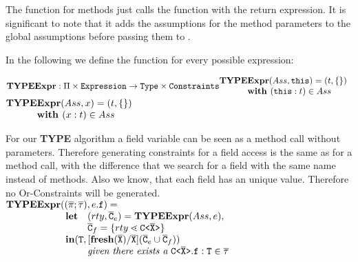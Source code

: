 \documentclass[a4paper,USenglish,cleveref, autoref, thm-restate]{lipics-v2021}
\begin{document}
The \typeMethod function for methods just calls the \typeExpr function with the
return expression. It is significant to note that it adds the assumptions for the method parameters to the global assumptions before passing them to \typeExpr.

\smallskip

In the following we define the \typeExpr function for every possible expression:

\smallskip

\noindent
$\typeExpr: \typeAssumptionsSymbol \times
\texttt{Expression} \rightarrow \texttt{Type} \times \texttt{Constraints}\\
\begin{array}{@{}l@{}l}
\textbf{TY} \textbf{PE} & \textbf{Expr} (Ass, \mathtt{this}) = (t , \{\})\\
& \textbf{with } (\mathtt{this} : t) \in Ass 
\end{array}
$
\smallskip
$\begin{array}{@{}l@{}l}
\textbf{TY} \textbf{PE} & \textbf{Expr} (Ass,x) = (t , \{\})\\
& \textbf{with } (x : t) \in Ass 
\end{array}
$

\smallskip

For our \textbf{TYPE} algorithm a field variable can be seen as a method call without parameters.
Therefore generating constraints for a field access is the same as for a method call,
with the difference that we search for a field with the same name instead of methods.
Also we know, that each field has an unique value. Therefore no Or-Constraints will be generated.
\\
\noindent
$\begin{array}{@{}l@{}l}
\typeExpr{} &(\typeAssumptions, e.\texttt{f}) = \\
& \begin{array}{ll}
\textbf{let} 
& (rty, \consSet_e) = \typeExpr(Ass, e),\\
& \consSet_f = \set{rty \lessdot \exptype{C}{\ol{X}}}\\
\multicolumn{2}{l}{\mathbf{in}
(\mathtt{T}, [\textbf{fresh}(\ol{X})/\ol{X}](\consSet_e \cup \consSet_f))}\\
& \textit{given there exists a}\ \exptype{C}{\ol{X}}.\texttt{f} : \type{T} \in \ol{\fieldAssumption}\\
\end{array} \\
\end{array}
$
\end{document}
